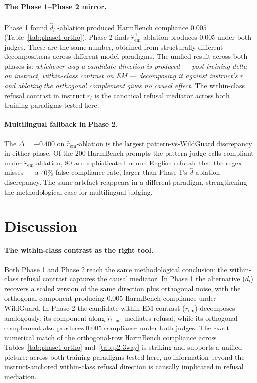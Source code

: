 \paragraph{The Phase 1--Phase 2 mirror.}
Phase 1 found $\hat{d}_l^\perp$-ablation produced HarmBench
compliance $0.005$ (Table~\ref{tab:phase1-ortho}). Phase 2 finds
$\hat{r}_{\text{em}}^\perp$-ablation produces $0.005$ under both
judges. These are the same number, obtained from structurally
different decompositions across different model paradigms. The
unified result across both phases is: \emph{whichever way a
candidate direction is produced --- post-training delta on instruct,
within-class contrast on EM --- decomposing it against instruct's
$r$ and ablating the orthogonal complement gives no causal effect.}
The within-class refusal contrast in instruct $r_l$ is the canonical
refusal mediator across both training paradigms tested here.

\paragraph{Multilingual fallback in Phase 2.}
The $\Delta = -0.400$ on $\hat{r}_{\text{em}}$-ablation is the
largest pattern-vs-WildGuard discrepancy in either phase. Of the
$200$ HarmBench prompts the pattern judge calls compliant under
$\hat{r}_{\text{em}}$-ablation, $80$ are sophisticated or
non-English refusals that the regex misses --- a $40\%$ false
compliance rate, larger than Phase 1's $\hat{d}$-ablation
discrepancy. The same artefact reappears in a different paradigm,
strengthening the methodological case for multilingual judging.

\section{Discussion}
\label{sec:discussion}

\paragraph{The within-class contrast as the right tool.}
Both Phase 1 and Phase 2 reach the same methodological conclusion:
the within-class refusal contrast captures the causal mediator. In
Phase 1 the alternative ($d_l$) recovers a scaled version of the
same direction plus orthogonal noise, with the orthogonal component
producing $0.005$ HarmBench compliance under WildGuard. In Phase 2
the candidate within-EM contrast ($r_{\text{em}}$) decomposes
analogously: its component along $\hat{r}_{l,\text{inst}}$
mediates refusal, while its orthogonal complement also produces
$0.005$ compliance under both judges. The exact numerical match of
the orthogonal-row HarmBench compliance across
Tables~\ref{tab:phase1-ortho} and~\ref{tab:p2-3way} is striking and
supports a unified picture: across both training paradigms tested
here, no information beyond the instruct-anchored within-class
refusal direction is causally implicated in refusal mediation.

